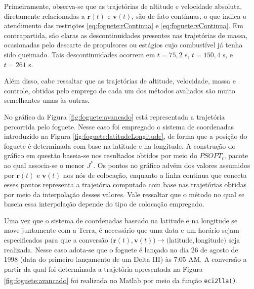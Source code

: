 
Primeiramente, observa-se que as trajetórias de altitude e velocidade absoluta, diretamente relacionadas a $ \mathbf{r}(t) $ e $ \mathbf{v}(t) $, são de fato contínuas, o que indica o atendimento das restrições \eqref{eq:foguete:rContinua} e \eqref{eq:foguete:vContinua}. Em contrapartida, são claras as descontinuidades presentes nas trajetórias de massa, ocasionadas pelo descarte de propulsores ou estágios cujo combustível já tenha sido queimado. Tais descontinuidades ocorrem em $ t = 75,2 $ s, $ t = 150,4 $ s, e $ t = 261 $ s. 

Além disso, cabe ressaltar que as trajetórias de altitude, velocidade, massa e controle, obtidas pelo emprego de cada um dos métodos avaliados são muito semelhantes umas às outras.  


No gráfico da Figura \ref{fig:foguete:avancado} está representada a trajetória percorrida pelo foguete. Nesse caso foi empregado o sistema de coordenadas introduzido na Figura \ref{fig:foguete:latitudeLongitude}, de forma que a posição do foguete é determinada com base na latitude e na longitude. A construção do gráfico em questão baseia-se nos resultados obtidos por meio do $ PSOPT_t $, pacote ao qual associa-se o menor $ J^* $. Os pontos no gráfico advém dos valores assumidos por $ \mathbf{r}(t) $ e $ \mathbf{v}(t) $ nos nós de colocação, enquanto a linha continua que conecta esses pontos representa a trajetória computada com base nas trajetórias obtidas por meio da interpolação desses valores. Vale ressaltar que o método no qual se baseia essa interpolação depende do tipo de colocação empregado. 

Uma vez que o sistema de coordenadas baseado na latitude e na longitude se move juntamente com a Terra, é necessário que uma data e um horário sejam especificados para que a conversão $ \big( \mathbf{r}(t), \mathbf{v}(t) \big) \rightarrow \big( \text{latitude}, \text{longitude} \big)$ seja realizada. Nesse caso adota-se que o foguete é lançado no dia 26 de agosto de 1998 (data do primeiro lançamento de um Delta III) às 7:05 AM. A conversão a partir da qual foi determinada a trajetória apresentada na Figura \ref{fig:foguete:avancado} foi realizada no Matlab\textsuperscript{\textregistered} por meio da função \texttt{eci2lla()}. 

